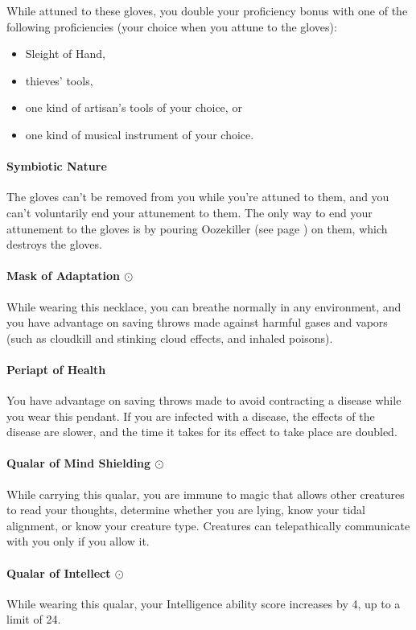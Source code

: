         While attuned to these gloves, you double your proficiency bonus with one of the following proficiencies (your choice when you attune to the gloves):
        \begin{itemize}
            \item Sleight of Hand,
            \item thieves' tools,
            \item one kind of artisan's tools of your choice, or
            \item one kind of musical instrument of your choice.
        \end{itemize}

        \paragraph{Symbiotic Nature}
        The gloves can't be removed from you while you're attuned to them, and you can't voluntarily end your attunement to them.
        The only way to end your attunement to the gloves is by pouring Oozekiller (see page \pageref{item::oozekiller}) on them, which destroys the gloves.
    \paragraph{Mask of Adaptation $\odot$}
        While wearing this necklace, you can breathe normally in any environment, and you have advantage on saving throws made against harmful gases and vapors (such as cloudkill and stinking cloud effects, and inhaled poisons).
    \paragraph{Periapt of Health}
        You have advantage on saving throws made to avoid contracting a disease while you wear this pendant.
        If you are infected with a disease, the effects of the disease are slower, and the time it takes for its effect to take place are doubled.
    \paragraph{Qualar of Mind Shielding $\odot$}
        While carrying this qualar, you are immune to magic that allows other creatures to read your thoughts, determine whether you are lying, know your tidal alignment, or know your creature type.
        Creatures can telepathically communicate with you only if you allow it.
    \paragraph{Qualar of Intellect $\odot$}
        While wearing this qualar, your Intelligence ability score increases by 4, up to a limit of 24.

